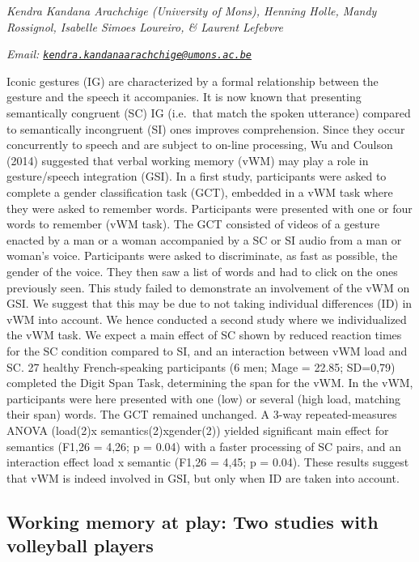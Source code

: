 \documentclass[12pt,]{book}
\begin{document}
\emph{Kendra Kandana Arachchige (University of Mons), Henning Holle, Mandy Rossignol, Isabelle Simoes Loureiro, \& Laurent Lefebvre}

\emph{Email: \href{mailto:kendra.kandanaarachchige@umons.ac.be}{\nolinkurl{kendra.kandanaarachchige@umons.ac.be}}}

Iconic gestures (IG) are characterized by a formal relationship between the gesture and the speech it accompanies. It is now known that presenting semantically congruent (SC) IG (i.e.~that match the spoken utterance) compared to semantically incongruent (SI) ones improves comprehension. Since they occur concurrently to speech and are subject to on-line processing, Wu and Coulson (2014) suggested that verbal working memory (vWM) may play a role in gesture/speech integration (GSI). In a first study, participants were asked to complete a gender classification task (GCT), embedded in a vWM task where they were asked to remember words. Participants were presented with one or four words to remember (vWM task). The GCT consisted of videos of a gesture enacted by a man or a woman accompanied by a SC or SI audio from a man or woman's voice. Participants were asked to discriminate, as fast as possible, the gender of the voice. They then saw a list of words and had to click on the ones previously seen. This study failed to demonstrate an involvement of the vWM on GSI. We suggest that this may be due to not taking individual differences (ID) in vWM into account. We hence conducted a second study where we individualized the vWM task. We expect a main effect of SC shown by reduced reaction times for the SC condition compared to SI, and an interaction between vWM load and SC. 27 healthy French-speaking participants (6 men; Mage = 22.85; SD=0,79) completed the Digit Span Task, determining the span for the vWM. In the vWM, participants were here presented with one (low) or several (high load, matching their span) words. The GCT remained unchanged. A 3-way repeated-measures ANOVA (load(2)x semantics(2)xgender(2)) yielded significant main effect for semantics (F1,26 = 4,26; p = 0.04) with a faster processing of SC pairs, and an interaction effect load x semantic (F1,26 = 4,45; p = 0.04). These results suggest that vWM is indeed involved in GSI, but only when ID are taken into account.

\hypertarget{working-memory-at-play-two-studies-with-volleyball-players}{%
\subsection{Working memory at play: Two studies with volleyball players}\label{working-memory-at-play-two-studies-with-volleyball-players}}
\end{document}
